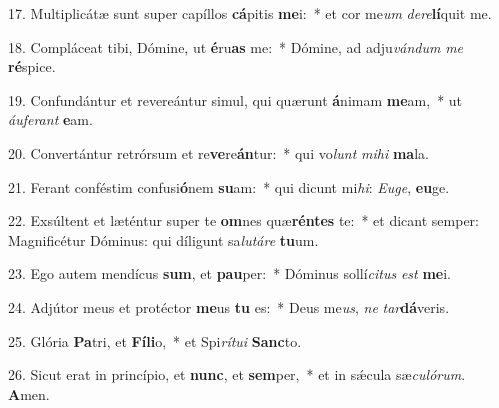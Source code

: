 17. Multiplicátæ sunt super capíllos \textbf{cá}pitis \textbf{me}i:~*  et cor me\textit{um} \textit{de}\textit{re}\textbf{lí}quit me.\

18. Compláceat tibi, Dómine, ut \textbf{é}ru\textbf{as} me:~*  Dómine, ad adju\textit{ván}\textit{dum} \textit{me} \textbf{ré}spice.\

19. Confundántur et revereántur simul, qui quærunt \textbf{á}nimam \textbf{me}am,~*  ut \textit{áu}\textit{fe}\textit{rant} \textbf{e}am.\

20. Convertántur retrórsum et re\textbf{ve}re\textbf{án}tur:~*  qui vo\textit{lunt} \textit{mi}\textit{hi} \textbf{ma}la.\

21. Ferant conféstim confusi\textbf{ó}nem \textbf{su}am:~*  qui dicunt mi\textit{hi}: \textit{Eu}\textit{ge}, \textbf{eu}ge.\

22. Exsúltent et læténtur super te \textbf{om}nes quæ\textbf{rén}\textbf{tes} te:~*  et dicant semper: Magnificétur Dóminus: qui díligunt sa\textit{lu}\textit{tá}\textit{re} \textbf{tu}um.\

23. Ego autem mendícus \textbf{sum}, et \textbf{pau}per:~*  Dóminus sollí\textit{ci}\textit{tus} \textit{est} \textbf{me}i.\

24. Adjútor meus et protéctor \textbf{me}us \textbf{tu} es:~*  Deus me\textit{us}, \textit{ne} \textit{tar}\textbf{dá}veris.\

25. Glória \textbf{Pa}tri, et \textbf{Fí}\textbf{li}o,~*  et Spi\textit{rí}\textit{tu}\textit{i} \textbf{Sanc}to.\

26. Sicut erat in princípio, et \textbf{nunc}, et \textbf{sem}per,~*  et in sǽcula sæ\textit{cu}\textit{ló}\textit{rum}. \textbf{A}men.\

